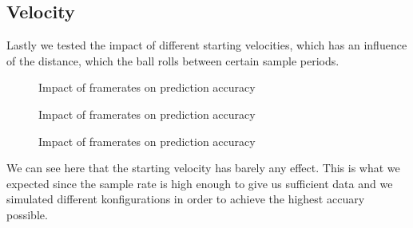 \documentclass[notitlepage, a4paper, 11pt]{scrartcl}
\begin{document}
\begin{multicols}{2}
\subsection{Velocity}

Lastly we tested the impact of different starting velocities, which has an influence of the distance, which the ball rolls between certain sample periods.

\begin{figure}[H]
    \centering
    \caption{Impact of framerates on prediction accuracy}
    \label{fig:velocity300}
\end{figure}

\begin{figure}[H]
    \centering
    \caption{Impact of framerates on prediction accuracy}
    \label{fig:velocity500}
\end{figure}

\begin{figure}[H]
    \centering
    \caption{Impact of framerates on prediction accuracy}
    \label{fig:velocity700}
\end{figure}

We can see here that the starting velocity has barely any effect. 
This is what we expected since the sample rate is high enough to give us sufficient data and we simulated different konfigurations in order to achieve the highest accuary possible.


\end{multicols}
\end{document}

